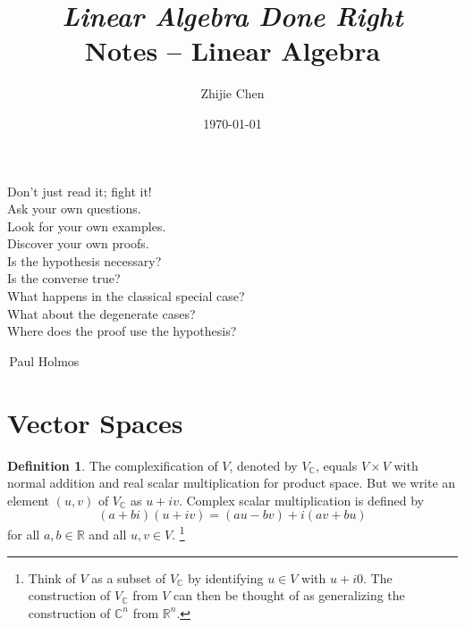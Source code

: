 \documentclass{tufte-handout}
\title{	
	\normalfont\normalsize 
	{\itshape Linear Algebra Done Right} \\ [0pt]
	\huge Notes -- Linear Algebra
}
\author{Zhijie Chen}
\date{\vspace{-5pt}\normalsize\today}
\theoremstyle{plain} %
\theoremstyle{definition}
\newtheorem{defn}[thm]{Definition}
\newtheorem{notns}[thm]{Notations}
\theoremstyle{remark}
\newcommand{\R}{\mathbb{R}}
\newcommand{\C}{\mathbb{C}}
\newcommand{\F}{\mathbb{F}}
\begin{document}
\justifying
\maketitle
\tableofcontents
\newpage

\thispagestyle{empty}
\begin{fullwidth}
	\Large
	\vspace*{\fill}
	\begin{center}
		Don't just read it; fight it!\\
		Ask your own questions.\\
		Look for your own examples.\\
		Discover your own proofs.\\
		Is the hypothesis necessary?\\
		Is the converse true?\\
		What happens in the classical special case?\\
		What about the degenerate cases?\\
		Where does the proof use the hypothesis?
	\end{center}
	\begin{flushright}
		\textemdash\,Paul Holmos\phantom{placeholderrrrrr}
	\end{flushright}
	\vspace*{\fill}
\end{fullwidth}
\newpage





\section{Vector Spaces}
\begin{defn}
	The complexification of $V$, denoted by $V_\C$, equals $V\times V$ with normal addition and real scalar multiplication for product space. But we write an element $(u,v)$ of $V_\C$ as $u+iv$. Complex scalar multiplication is defined by
	\[(a+bi)(u+iv)=(au-bv)+i(av+bu)\]
	for all $a,b\in\R$ and all $u,v\in V$.%
	\footnote{Think of $V$ as a subset of $V_\C$ by identifying $u\in V$ with $u+i0$. The construction of $V_\C$ from $V$ can then be thought of as generalizing the construction of $\C^n$ from $\R^n$.}
\end{defn}
\end{document}
